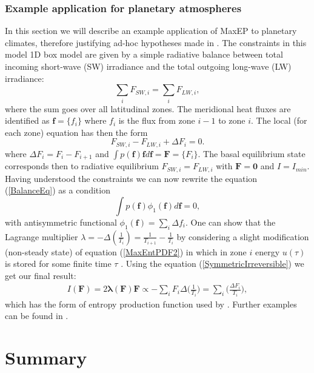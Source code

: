 \documentclass[a4paper,12pt]{article}
\begin{document}
\subsubsection{Example application for planetary atmospheres}

In this section we will describe an example application of MaxEP to planetary climates, therefore justifying ad-hoc hypotheses made in \cite{Paltridge:2007jf}\cite{Lorenz:J80tzZkl}.
The constraints in this model 1D box model are given by a simple radiative balance between total incoming short-wave (SW) irradiance and the total outgoing long-wave (LW) irradiance:
\begin{equation}
\label{BalanceEq}
  \sum_i F_{SW,i}= \sum_i F_{LW,i},
\end{equation}
where the sum goes over all latitudinal zones. The meridional heat fluxes are identified as $\bm{f}=\{f_i\}$ where $f_i$ is the flux from zone $i-1$ to zone $i$. 
The local (for each zone) equation has then the form
\begin{equation}
  F_{SW,i}- F_{LW,i} + \Delta F_i = 0.
\end{equation}
where $\Delta F_i = F_i - F_{i+1}$ and $\int p(\bm{f})\bm{f} d\bm{f}=\bm{F}=\{F_i\}$. 
The basal equilibrium state corresponds then to radiative equilibrium $F_{SW,i}= F_{LW,i}$ with $\bm{F}=\bm{0}$ and $I=I_{min}$. Having understood the constraints we can now rewrite the equation (\ref{BalanceEq}) as a condition
\begin{equation}
  \int p(\bm{f})\phi_1(\bm{f})d\bm{f} =0,
\end{equation}
with antisymmetric functional $\phi_1(\bm{f})=\sum_i \Delta f_i$. 
One can show that the Lagrange multiplier $\lambda = - \Delta (\frac{1}{T_i}) = \frac{1}{T_{i+1}}-\frac{1}{T_i}$ by considering a slight modification (non-steady state) of equation (\ref{MaxEntPDF2}) in which in zone $i$ energy $u(\tau)$ is stored for some finite time $\tau$ \cite{Dewar:2014ek}. 
Using the equation (\ref{SymmetricIrreversible}) we get our final result:
\begin{equation}
\begin{aligned}
  I(\bm{F})=2 \bm{\lambda}(\bm{F})\bm{F} \propto - \sum_i F_i \Delta\bigg(\frac{1}{T_i}\bigg)= \sum_i \bigg(\frac{\Delta F_i}{T_i}\bigg),
\end{aligned}
\end{equation}
which has the form of entropy production function used by \cite{Paltridge:2007jf, Lorenz:J80tzZkl}.
Further examples can be found in \cite{Dewar:2014ek}.
\section{Summary}
\end{document}
